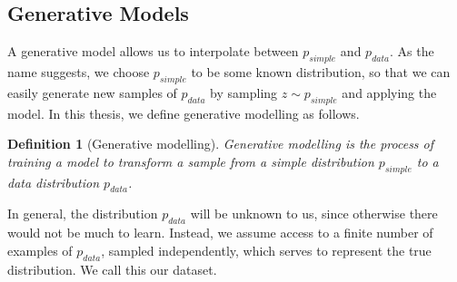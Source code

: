 \documentclass[12pt]{article}
\theoremstyle{break}
\newtheorem{definition}{Definition}[section]
\newcommand\at[2]{\left.#1\right|_{#2}}
\begin{document}
%
%
%
%
%
%
%
%
%

\subsection{Generative Models}
	A generative model allows us to interpolate between $p_{simple}$ and $p_{data}$. As the name suggests, we choose $p_{simple}$ to be some known distribution, so that we can easily generate new samples of $p_{data}$ by sampling $z \sim p_{simple}$ and applying the model. In this thesis, we define generative modelling as follows.

\begin{definition}[Generative modelling]
	Generative modelling is the process of training a model to transform a sample from a simple distribution $p_{simple}$ to a data distribution $p_{data}$. 
\end{definition}

In general, the distribution $p_{data}$ will be unknown to us, since otherwise there would not be much to learn. Instead, we assume access to a finite number of examples of $p_{data}$, sampled independently, which serves to represent the true distribution. We call this our dataset.
	
\end{document}
